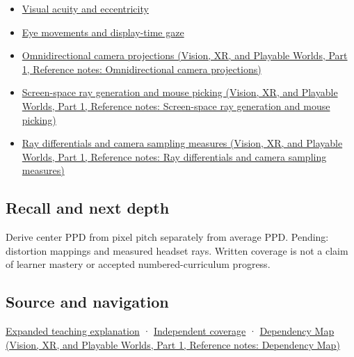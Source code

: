 \begin{itemize}
\item
  \hyperref[appendix-b491fc48c54b]{Visual acuity and eccentricity}
\item
  \hyperref[appendix-a6f2c4fe1996]{Eye movements and display-time gaze}
\item
  \href{../07-Vision-XR-and-Playable-Worlds-P01/main.pdf\#appendix-fc99ad39f351}{Omnidirectional camera projections (Vision, XR, and Playable Worlds, Part 1, Reference notes: Omnidirectional camera projections)}
\item
  \href{../07-Vision-XR-and-Playable-Worlds-P01/main.pdf\#appendix-f1a6d43e80d1}{Screen-space ray generation and mouse picking (Vision, XR, and Playable Worlds, Part 1, Reference notes: Screen-space ray generation and mouse picking)}
\item
  \href{../07-Vision-XR-and-Playable-Worlds-P01/main.pdf\#appendix-8c40fad29462}{Ray differentials and camera sampling measures (Vision, XR, and Playable Worlds, Part 1, Reference notes: Ray differentials and camera sampling measures)}
\end{itemize}

\subsection{Recall and next depth}\label{appendix-7d356c396d1a-recall-and-next-depth}

\hypertarget{appendix-7d356c396d1a-recall-and-next-depth}{}

Derive center PPD from pixel pitch separately from average PPD. Pending: distortion mappings and measured headset rays. Written coverage is not a claim of learner mastery or accepted numbered-curriculum progress.

\subsection{Source and navigation}\label{appendix-7d356c396d1a-source-and-navigation}

\hypertarget{appendix-7d356c396d1a-source-and-navigation}{}

\hyperref[04-visual-computing-ii-ch042-angles-connect-display-samples-to-a-viewer]{Expanded teaching explanation} · \hyperref[appendix-fd090d982a15-xr01---independent-seeing-and-representation-source]{Independent coverage} · \href{../07-Vision-XR-and-Playable-Worlds-P01/main.pdf\#appendix-4ad47bdd269a}{Dependency Map (Vision, XR, and Playable Worlds, Part 1, Reference notes: Dependency Map)}

